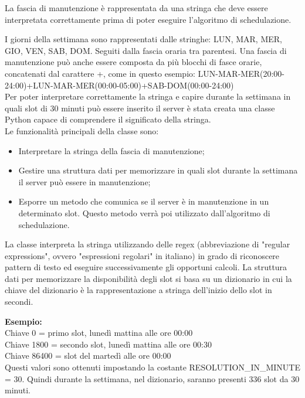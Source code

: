 La fascia di manutenzione è rappresentata da una stringa che deve essere 
interpretata correttamente prima di poter eseguire l’algoritmo di schedulazione. 

I giorni della settimana sono rappresentati dalle stringhe: 
LUN, MAR, MER, GIO, VEN, SAB, DOM. Seguiti dalla fascia oraria tra parentesi.
Una fascia di manutenzione può anche essere composta da più blocchi di fasce 
orarie, concatenati dal carattere +, come in questo esempio: 
LUN-MAR-MER(20:00-24:00)+LUN-MAR-MER(00:00-05:00)+SAB-DOM(00:00-24:00)\\

Per poter interpretare correttamente la stringa e capire durante la settimana in quali 
slot di 30 minuti può essere inserito il server è stata creata una classe 
Python capace di comprendere il significato della stringa.\\

Le funzionalità principali della classe sono:
\begin{itemize}
\item Interpretare la stringa della fascia di manutenzione;
\item Gestire una struttura dati per memorizzare in quali slot durante la 
settimana il server può essere in manutenzione;
\item Esporre un metodo che comunica se il server è in manutenzione in un 
determinato slot. Questo metodo verrà poi utilizzato dall’algoritmo di schedulazione.
\end{itemize}

La classe interpreta la stringa utilizzando delle regex (abbreviazione di 
"regular expressions", ovvero "espressioni regolari" in italiano) in grado di 
riconoscere pattern di testo ed eseguire successivamente gli opportuni calcoli.
La struttura dati per memorizzare la disponibilità degli slot si basa su un 
dizionario in cui la chiave del dizionario è la rappresentazione a stringa 
dell’inizio dello slot in secondi.

\textbf{Esempio:}\\
Chiave 0 = primo slot, lunedì mattina alle ore 00:00\\
Chiave 1800 = secondo slot, lunedì mattina alle ore 00:30\\
Chiave 86400 = slot del martedì alle ore 00:00\\

Questi valori sono ottenuti impostando la costante RESOLUTION\_IN\_MINUTE = 30. 
Quindi durante la settimana, nel dizionario, saranno presenti 336 slot da 30 minuti.

